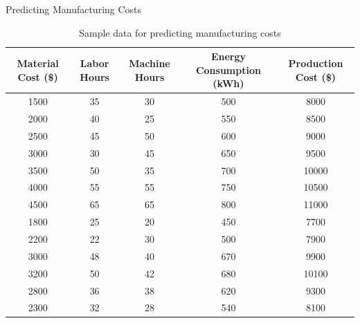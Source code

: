 \begin{examplewithcode}{Predicting Manufacturing Costs}{}
\begin{table}[ht]
\centering
\begin{tabular}{ccccc}
\hline
\textbf{Material Cost (\$)} & \textbf{Labor Hours} & \textbf{Machine Hours} & \textbf{Energy Consumption (kWh)} & \textbf{Production Cost (\$)} \\ \hline
1500                       & 35                   & 30                     & 500                               & 8000                         \\
2000                       & 40                   & 25                     & 550                               & 8500                         \\
2500                       & 45                   & 50                     & 600                               & 9000                         \\
3000                       & 30                   & 45                     & 650                               & 9500                         \\
3500                       & 50                   & 35                     & 700                               & 10000                        \\
4000                       & 55                   & 55                     & 750                               & 10500                        \\
4500                       & 65                   & 65                     & 800                               & 11000                        \\
1800                       & 25                   & 20                     & 450                               & 7700                         \\
2200                       & 22                   & 30                     & 500                               & 7900                         \\
3000                       & 48                   & 40                     & 670                               & 9900                         \\
3200                       & 50                   & 42                     & 680                               & 10100                        \\
2800                       & 36                   & 38                     & 620                               & 9300                         \\
2300                       & 32                   & 28                     & 540                               & 8100                         \\ \hline
\end{tabular}
\caption{Sample data for predicting manufacturing costs}
\label{table:manufacturing_costs}
\end{table}



\end{examplewithcode}
